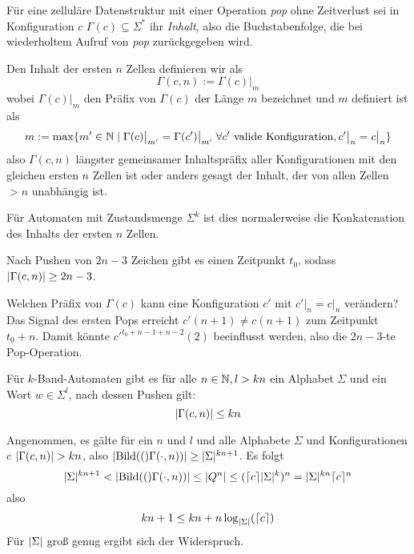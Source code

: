 \documentclass{article}
\begin{document}
\begin{definition}
    Für eine zelluläre Datenstruktur mit einer Operation \emph{pop} ohne Zeitverlust sei in Konfiguration $c$ $\Gamma(c) \subseteq \Sigma^*$ ihr \emph{Inhalt}, also die Buchstabenfolge, die bei wiederholtem Aufruf von \emph{pop} zurückgegeben wird.

    Den Inhalt der ersten $n$ Zellen definieren wir als
        \[ \Gamma(c,n) := \Gamma(c) \big|_m \]
    wobei $\Gamma(c) \big|_m$ den Präfix von $\Gamma(c)$ der Länge $m$ bezeichnet und $m$ definiert ist als
    \[ m := \max \{m' \in \mathbb{N} \mid \Gamma(c) \big|_{m'} = \Gamma(c') \big|_{m'} \;\forall c' \text{ valide Konfiguration}, c' \big|_n = c \big|_n \} \]
    also $\Gamma(c,n)$ längster gemeinsamer Inhaltspräfix aller Konfigurationen mit den gleichen ersten $n$ Zellen ist oder anders gesagt der Inhalt, der von allen Zellen $> n$ unabhängig ist.

    Für Automaten mit Zustandsmenge $\Sigma^k$ ist dies normalerweise die Konkatenation des Inhalts der ersten $n$ Zellen.
\end{definition}

\begin{satz}
    \label{thm:locontent}
    Nach Pushen von $2n-3$ Zeichen gibt es einen Zeitpunkt $t_0$, sodass $\lvert\Gamma(c,n)\rvert \geq 2n-3$.
    \begin{beweis}
        Welchen Präfix von $\Gamma(c)$ kann eine Konfiguration $c'$ mit $c' \big|_n = c \big|_n$ verändern? Das Signal des ersten Pops erreicht $c'(n+1) \neq c(n+1)$ zum Zeitpunkt $t_0+n$. Damit könnte $c'^{t_0+n-1+n-2}(2)$ beeinflusst werden, also die $2n-3$-te Pop-Operation.
    \end{beweis}
\end{satz}

\begin{satz}
    \label{cor:spacesize}
    Für $k$-Band-Automaten gibt es für alle $n \in \mathbb{N}, l > kn$ ein Alphabet $\Sigma$ und ein Wort $w \in \Sigma^l$, nach dessen Pushen gilt:
    \[ \lvert\Gamma(c,n)\rvert \leq kn \]
    \begin{beweis}
        Angenommen, es gälte für ein $n$ und $l$ und alle Alphabete $\Sigma$ und Konfigurationen $c$ $\lvert\Gamma(c,n)\rvert > kn$, also $\lvert\text{Bild}(()\Gamma(\cdot,n))\rvert \geq \lvert\Sigma\rvert^{kn+1}$.
        Es folgt
        \[ \lvert\Sigma\rvert^{kn+1} < \lvert\text{Bild}(()\Gamma(\cdot,n))\rvert \leq \lvert Q^n\rvert \leq (\lceil c\rceil\lvert\Sigma\rvert^k)^n = \lvert\Sigma\rvert^{kn} \lceil c\rceil^n \]
        also
        \[ kn + 1 \leq kn + n \log_{\lvert\Sigma\rvert}(\lceil c\rceil) \]
        Für $\lvert\Sigma\rvert$ groß genug ergibt sich der Widerspruch.
    \end{beweis}
\end{satz}
\end{document}
